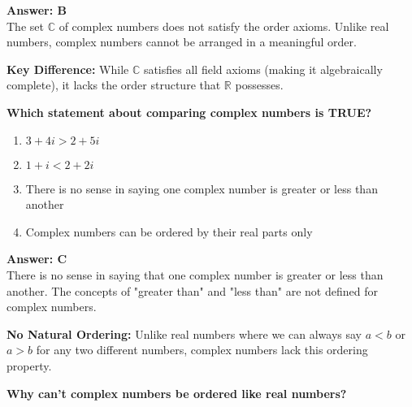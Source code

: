 \documentclass[12pt,a4paper]{article}
\begin{document}
\begin{answerstyle}
\textbf{Answer: B} \\
The set \( \mathbb{C} \) of complex numbers does not satisfy the order axioms. Unlike real numbers, complex numbers cannot be arranged in a meaningful order.
\end{answerstyle}

\begin{conceptbox}
\textbf{Key Difference:} While \( \mathbb{C} \) satisfies all field axioms (making it algebraically complete), it lacks the order structure that \( \mathbb{R} \) possesses.
\end{conceptbox}

\newpage
\begin{questiontitle}[MCQ 68]
\textbf{Which statement about comparing complex numbers is TRUE?}
\end{questiontitle}

\begin{partbox}[Options]
\begin{enumerate}[label=\Alph*.]
    \item \( 3 + 4i > 2 + 5i \)
    \item \( 1 + i < 2 + 2i \)
    \item There is no sense in saying one complex number is greater or less than another
    \item Complex numbers can be ordered by their real parts only
\end{enumerate}
\end{partbox}

\begin{answerstyle}
\textbf{Answer: C} \\
There is no sense in saying that one complex number is greater or less than another. The concepts of "greater than" and "less than" are not defined for complex numbers.
\end{answerstyle}

\begin{conceptbox}
\textbf{No Natural Ordering:} Unlike real numbers where we can always say \( a < b \) or \( a > b \) for any two different numbers, complex numbers lack this ordering property.
\end{conceptbox}

\newpage
\begin{questiontitle}[MCQ 69]
\textbf{Why can't complex numbers be ordered like real numbers?}
\end{questiontitle}
\end{document}
